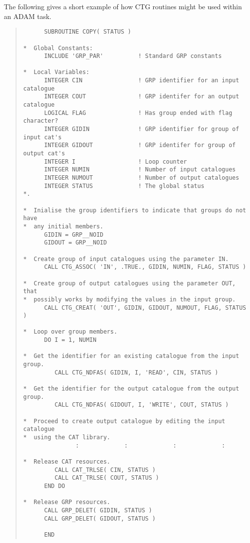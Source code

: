 \documentclass[twoside,11pt]{article}
\renewcommand{\_}{\texttt{\symbol{95}}}
\begin{document}
The following gives a short example of how CTG routines might be 
used within an ADAM task.
\begin{quote}
\latexonly{\small}
\begin{verbatim}
      SUBROUTINE COPY( STATUS )

*  Global Constants:
      INCLUDE 'GRP_PAR'          ! Standard GRP constants

*  Local Variables:
      INTEGER CIN                ! GRP identifier for an input catalogue
      INTEGER COUT               ! GRP identifer for an output catalogue
      LOGICAL FLAG               ! Has group ended with flag character?
      INTEGER GIDIN              ! GRP identifier for group of input cat's
      INTEGER GIDOUT             ! GRP identifer for group of output cat's
      INTEGER I                  ! Loop counter
      INTEGER NUMIN              ! Number of input catalogues
      INTEGER NUMOUT             ! Number of output catalogues
      INTEGER STATUS             ! The global status
*.

*  Inialise the group identifiers to indicate that groups do not have
*  any initial members.
      GIDIN = GRP__NOID
      GIDOUT = GRP__NOID

*  Create group of input catalogues using the parameter IN.
      CALL CTG_ASSOC( 'IN', .TRUE., GIDIN, NUMIN, FLAG, STATUS )

*  Create group of output catalogues using the parameter OUT, that 
*  possibly works by modifying the values in the input group.
      CALL CTG_CREAT( 'OUT', GIDIN, GIDOUT, NUMOUT, FLAG, STATUS )

*  Loop over group members.
      DO I = 1, NUMIN

*  Get the identifier for an existing catalogue from the input group.
         CALL CTG_NDFAS( GIDIN, I, 'READ', CIN, STATUS )

*  Get the identifier for the output catalogue from the output group.
         CALL CTG_NDFAS( GIDOUT, I, 'WRITE', COUT, STATUS )

*  Proceed to create output catalogue by editing the input catalogue
*  using the CAT library.
               :             :             :             :

*  Release CAT resources.
         CALL CAT_TRLSE( CIN, STATUS )
         CALL CAT_TRLSE( COUT, STATUS )
      END DO

*  Release GRP resources.
      CALL GRP_DELET( GIDIN, STATUS )
      CALL GRP_DELET( GIDOUT, STATUS )

      END
\end{verbatim}
\end{quote}
\end{document}
